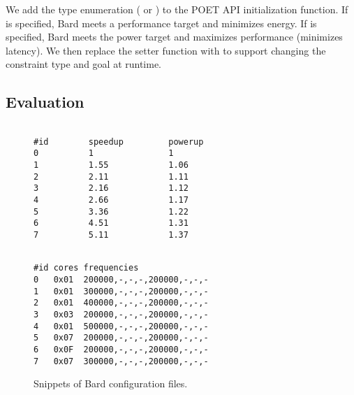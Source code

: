 We add the  type enumeration ( or ) to the POET API initialization function.
If  is specified, Bard meets a performance target and minimizes energy.
If  is specified, Bard meets the power target and maximizes performance (minimizes latency).
We then replace the setter function  with  to support changing the constraint type and goal at runtime.


\subsection{Evaluation}


\begin{figure}[t]
\centering
\begin{minipage}[t]{.45\columnwidth}
\lstset{
  belowskip=0pt,
  aboveskip=0pt,
  numbers=none,
}
\begin{lstlisting}[frame=tlr,%
  caption={System-agnostic.},%
  label={lst:control_config_example}]%

#id        speedup         powerup
0          1               1
1          1.55            1.06
2          2.11            1.11
3          2.16            1.12
4          2.66            1.17
5          3.36            1.22
6          4.51            1.31
7          5.11            1.37
\end{lstlisting}
\end{minipage}
\hspace*{0.4cm}
\begin{minipage}[t]{.45\columnwidth}
\lstset{
  belowskip=0pt,
  aboveskip=0pt,
  numbers=none,
}
\begin{lstlisting}[frame=tlr,%
  caption={System-specific.},%
  label={lst:cpu_config_example}]%

#id cores frequencies
0   0x01  200000,-,-,-,200000,-,-,-
1   0x01  300000,-,-,-,200000,-,-,-
2   0x01  400000,-,-,-,200000,-,-,-
3   0x03  200000,-,-,-,200000,-,-,-
4   0x01  500000,-,-,-,200000,-,-,-
5   0x07  200000,-,-,-,200000,-,-,-
6   0x0F  200000,-,-,-,200000,-,-,-
7   0x07  300000,-,-,-,200000,-,-,-
\end{lstlisting}
\end{minipage}
\caption{Snippets of Bard configuration files.}
\label{fig:bard-config-examples}
\end{figure}

